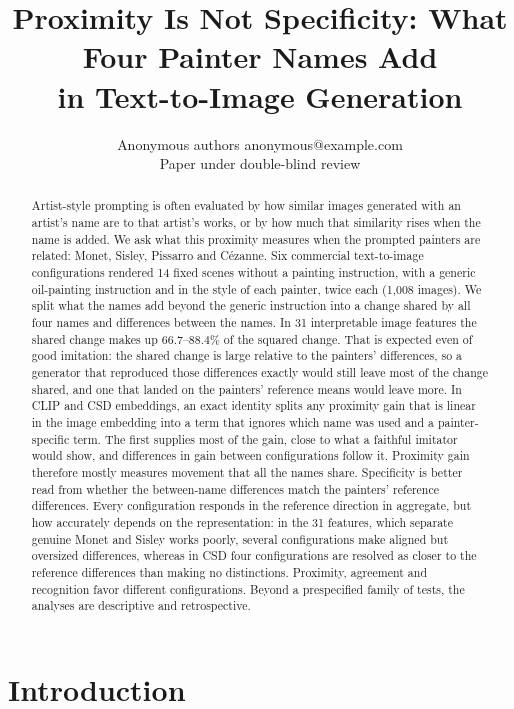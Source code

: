 \documentclass[10pt]{article}
\title{Proximity Is Not Specificity: What Four Painter Names Add\\in Text-to-Image Generation}
\author{\name Anonymous authors \email anonymous@example.com \\
      \addr Paper under double-blind review}
\begin{document}
\maketitle

\begin{abstract}
Artist-style prompting is often evaluated by how similar images generated with an artist's name
are to that artist's works, or by how much that similarity rises when the name is added. We ask
what this proximity measures when the prompted painters are related: Monet, Sisley, Pissarro and
C\'ezanne. Six commercial text-to-image configurations rendered 14 fixed scenes without a painting
instruction, with a generic oil-painting instruction and in the style of each painter, twice each
(1,008 images). We split what the names add beyond the generic instruction into a change shared by
all four names and differences between the names. In 31 interpretable image features the shared
change makes up 66.7--88.4\% of the squared change. That is expected even of good imitation: the
shared change is large relative to the painters' differences, so a generator that reproduced those
differences exactly would still leave most of the change shared, and one that landed on the
painters' reference means would leave more. In CLIP and CSD embeddings, an exact identity splits
any proximity gain that is linear in the image embedding into a term that ignores which name was
used and a painter-specific term. The first supplies most of the gain, close to what a faithful
imitator would show, and differences in gain between configurations follow it. Proximity gain
therefore mostly measures movement that all the names share. Specificity is better read from
whether the between-name differences match the painters' reference differences. Every
configuration responds in the reference direction in aggregate, but how accurately depends on the
representation: in the 31 features, which separate genuine Monet and Sisley works poorly, several
configurations make aligned but oversized differences, whereas in CSD four configurations are
resolved as closer to the reference differences than making no distinctions. Proximity, agreement
and recognition favor different configurations. Beyond a prespecified family of tests, the
analyses are descriptive and retrospective.
\end{abstract}

\section{Introduction}\label{sec:intro}
\end{document}
